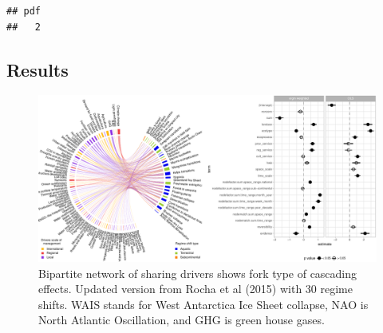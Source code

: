 \documentclass[9pt,]{article}
\begin{document}
\begin{verbatim}
## pdf 
##   2
\end{verbatim}

\subsection{Results}\label{results}

\begin{figure}

{\centering \includegraphics{170830_draftCascadingEffects_files/figure-latex/Fig3-1} 

}

\caption{Bipartite network of sharing drivers shows fork type of cascading effects. Updated version from Rocha et al (2015) with 30 regime shifts. WAIS stands for West Antarctica Ice Sheet collapse, NAO is North Atlantic Oscillation, and GHG is green house gases.}\label{fig:Fig3}
\end{figure}
\end{document}
